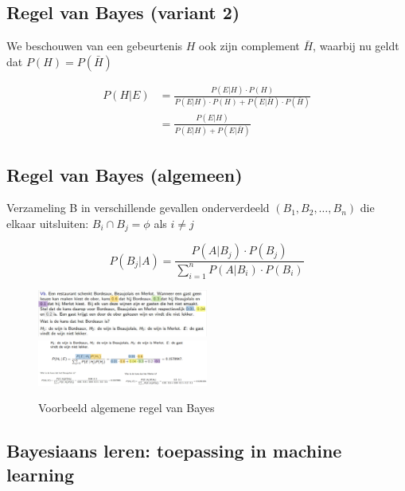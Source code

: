 \documentclass{article}
\begin{document}
\subsection{Regel van Bayes (variant 2)}

We beschouwen van een gebeurtenis $H$ ook zijn complement $\bar{H}$, 
waarbij nu geldt dat $P(H) = P(\bar{H})$


\begin{center}
    \begin{align}
        P(H | E) & = \frac{P(E | H) \cdot P(H)}{P(E | H) \cdot P(H) + P(E | \bar{H}) \cdot P(\bar{H})}\\
        & = \frac{P(E | H)}{P(E | H) + P(E | \bar{H})}
    \end{align}
\end{center}

\subsection{Regel van Bayes (algemeen)}

Verzameling B in verschillende gevallen onderverdeeld $(B_1, B_2, \dots, B_n)$ die elkaar
uitsluiten: $B_i \cap B_j = \phi$ als $i \neq j$

\begin{equation}
    P(B_j | A) = \frac{P(A | B_j) \cdot P(B_j)}{\sum_{i=1}^n P(A|B_i) \cdot P(B_i)}
\end{equation}

\begin{figure}[H]
    \centering
    \includegraphics[width=0.5\textwidth]{bayes-algemeen-voorbeeld1.png}
    \includegraphics[width=0.5\textwidth]{bayes-algemeen-voorbeeld1-opl.png}
    \caption{Voorbeeld algemene regel van Bayes}
\end{figure}

\subsection{Bayesiaans leren: toepassing in machine learning}
\end{document}
